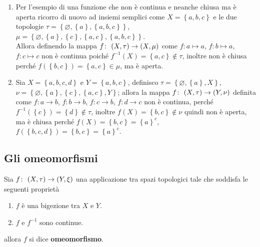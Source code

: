 \begin{example}
\begin{enumerate}
	\item Per l'esempio di una funzione che non è continua e neanche chiusa ma è aperta ricorro di nuovo ad insiemi semplici come $X = \left\{a,b,c\right\}$ e le due topologie $\tau = \left\{\varnothing, \left\{a\right\},\left\{a,b,c\right\}\right\}$, $\mu = \left\{\varnothing, \left\{a\right\}, \left\{c\right\}, \left\{a,c\right\}, \left\{a,b,c\right\}\right\}$. \\ Allora definendo la mappa $f \colon\ (X,\tau) \rightarrow (X,\mu)$ come $f \colon a \mapsto a$, $f \colon b \mapsto a$, $f \colon c \mapsto c$ non è continua poiché $f^{-1}(X) = \left\{a,c\right\} \notin \tau$, inoltre non è chiusa perché $f(\left\{b,c\right\}) = \left\{a,c\right\} \in \mu$, ma è aperta.\\
	\item Sia $X = \left\{a,b,c,d\right\}$  e $Y = \left\{a,b,c\right\}$, definisco $\tau = \left\{\varnothing, \left\{a\right\}, X\right\}$, $\nu = \left\{\varnothing, \left\{a\right\}, \left\{c\right\}, \left\{a,c\right\}, Y\right\}$; allora la mappa $f \colon\ (X,\tau) \rightarrow (Y,\nu)$ definita come $f \colon a \rightarrow b$,  $f \colon b \rightarrow b$, $f \colon c \rightarrow b$, $f \colon d \rightarrow c$ non è continua, perché $f^{-1}(\left\{c\right\}) = \left\{d\right\} \notin \tau$, inoltre $f(X) = \left\{b,c\right\} \notin \nu$ quindi non è aperta, ma è chiusa perché $f(X) = \left\{b,c\right\} = \left\{a\right\}^c$, $f(\left\{b,c,d\right\}) = \left\{b,c\right\} = \left\{a\right\}^c$.   
\end{enumerate}
\end{example}



\subsection{\textcolor{TopGener}{\textbf{Gli omeomorfismi}}}



\begin{definition}
	Sia $f \colon\ (X,\tau) \rightarrow (Y,\xi)$ una applicazione tra spazi topologici tale che soddisfa le seguenti proprietà
	\begin{enumerate}
		\item $f$ è una bigezione tra $X$ e $Y$.
		\item $f$ e $f^{-1}$ sono continue.
	\end{enumerate} 
	allora $f$ si dice \textbf{omeomorfismo}. 
\end{definition}

